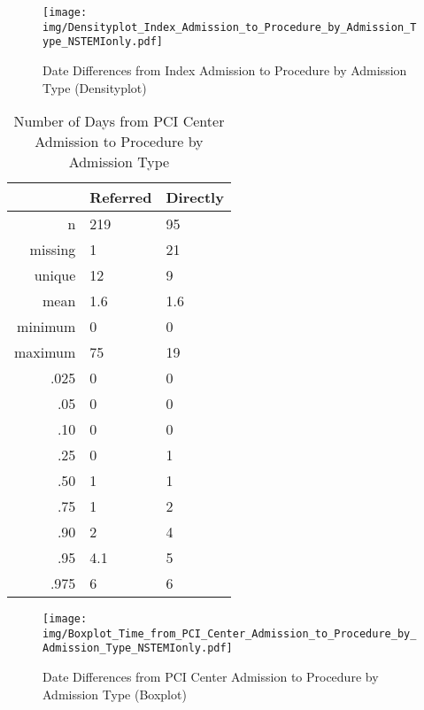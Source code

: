 \documentclass[presentation,xcolor=pdftex,dvipsnames,table,11pt]{beamer}
\begin{document}
\begin{tiny}
\begin{frame}
\begin{figure}
  \centering
  \caption{Date Differences from Index Admission to Procedure by Admission Type (Densityplot)}
  \label{Density: Date Differences from Index Admission to Procedure by Admission Type}
\texttt{[image: img/Densityplot\_Index\_Admission\_to\_Procedure\_by\_Admission\_Type\_NSTEMIonly.pdf]}\end{figure}
\end{frame}





\begin{table}[ht]
\centering
\begin{tabular}{rll}
  \toprule
 & Referred & Directly \\ 
  \midrule
n & 219 & 95 \\ 
  missing & 1 & 21 \\ 
  unique & 12 & 9 \\ 
  mean & 1.6 & 1.6 \\ 
  minimum & 0 & 0 \\ 
  maximum & 75 & 19 \\ 
  .025 & 0 & 0 \\ 
  .05 & 0 & 0 \\ 
  .10 & 0 & 0 \\ 
  .25 & 0 & 1 \\ 
  .50 & 1 & 1 \\ 
  .75 & 1 & 2 \\ 
  .90 & 2 & 4 \\ 
  .95 & 4.1 & 5 \\ 
  .975 & 6 & 6 \\ 
   \bottomrule
\end{tabular}
\caption{Number of Days from PCI Center Admission to Procedure by Admission Type} 
\end{table}
\begin{frame}
\begin{figure}
  \centering
  \caption{Date Differences from PCI Center Admission to Procedure by Admission Type (Boxplot)}
  \label{Boxplot: Date Differences from PCI Center Admission to Procedure by Admission Type}
\texttt{[image: img/Boxplot\_Time\_from\_PCI\_Center\_Admission\_to\_Procedure\_by\_Admission\_Type\_NSTEMIonly.pdf]}\end{figure}
\end{frame}



\end{tiny}
\end{document}

